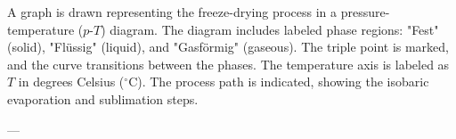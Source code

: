 A graph is drawn representing the freeze-drying process in a pressure-temperature (\(p\)-\(T\)) diagram. The diagram includes labeled phase regions: "Fest" (solid), "Flüssig" (liquid), and "Gasförmig" (gaseous). The triple point is marked, and the curve transitions between the phases. The temperature axis is labeled as \( T \) in degrees Celsius (\( ^\circ\text{C} \)). The process path is indicated, showing the isobaric evaporation and sublimation steps.

---